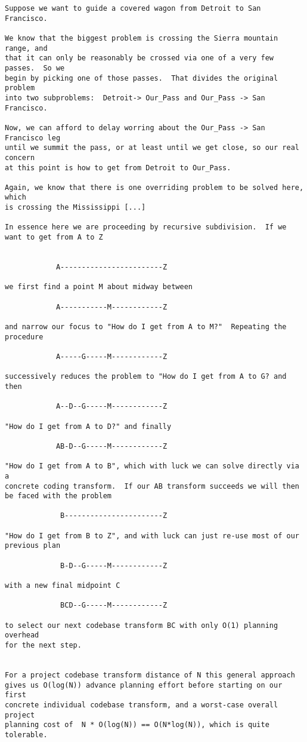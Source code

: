 \begin{verbatim}
Suppose we want to guide a covered wagon from Detroit to San Francisco.

We know that the biggest problem is crossing the Sierra mountain range, and
that it can only be reasonably be crossed via one of a very few passes.  So we
begin by picking one of those passes.  That divides the original problem
into two subproblems:  Detroit-> Our_Pass and Our_Pass -> San Francisco.

Now, we can afford to delay worring about the Our_Pass -> San Francisco leg
until we summit the pass, or at least until we get close, so our real concern
at this point is how to get from Detroit to Our_Pass.

Again, we know that there is one overriding problem to be solved here, which
is crossing the Mississippi [...]

In essence here we are proceeding by recursive subdivision.  If we want to get from A to Z


            A------------------------Z

we first find a point M about midway between

            A-----------M------------Z

and narrow our focus to "How do I get from A to M?"  Repeating the procedure

            A-----G-----M------------Z

successively reduces the problem to "How do I get from A to G? and then

            A--D--G-----M------------Z

"How do I get from A to D?" and finally

            AB-D--G-----M------------Z

"How do I get from A to B", which with luck we can solve directly via a
concrete coding transform.  If our AB transform succeeds we will then
be faced with the problem

             B-----------------------Z

"How do I get from B to Z", and with luck can just re-use most of our
previous plan

             B-D--G-----M------------Z

with a new final midpoint C

             BCD--G-----M------------Z

to select our next codebase transform BC with only O(1) planning overhead
for the next step.


For a project codebase transform distance of N this general approach
gives us O(log(N)) advance planning effort before starting on our first
concrete individual codebase transform, and a worst-case overall project
planning cost of  N * O(log(N)) == O(N*log(N)), which is quite tolerable.


\end{verbatim}
